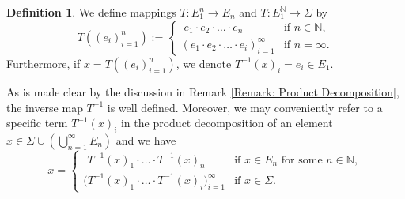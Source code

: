 \documentclass{amsart}
\numberwithin{equation}{section}
\theoremstyle{definition}
\newtheorem{definition}[equation]{Definition}
\theoremstyle{remark}
\newcommand{\N}{\mathbb{N}}
\begin{document}
\begin{definition}\label{def:Tdef}
    We define mappings \(T:E_1^n \to E_n\) and \(T:E_1^\N \to \Sigma\) by
        \[
            T((e_i)_{i=1}^n):=\begin{cases}
                \;e_1\cdot e_2\cdot \ldots \cdot e_n&\text{if }n\in \N,\\
                (e_1\cdot e_2\cdot \ldots \cdot e_i)_{i=1}^\infty&\text{if }n=\infty.
            \end{cases}
        \]
    Furthermore, if \(x=T((e_i)_{i=1}^n)\), we denote \(T^{-1}(x)_i=e_i\in E_1\).
\end{definition}

As is made clear by the discussion in Remark \ref{Remark: Product Decomposition}, the inverse map \(T^{-1}\) is well defined. Moreover, we may conveniently refer to a specific term \(T^{-1}(x)_i\) in the product decomposition of an element \(x\in \Sigma\cup(\bigcup_{n=1}^\infty E_n)\) and we have
    \[
        x=\begin{cases}
            \,\ T^{-1}(x)_1\cdot \ldots \cdot T^{-1}(x)_n&\text{if }x\in E_n\text{ for some }n\in \N,\\
            \big(T^{-1}(x)_1\cdot \ldots \cdot T^{-1}(x)_i\big)_{i=1}^\infty&\text{if }x\in \Sigma.
        \end{cases}
    \]
\end{document}
